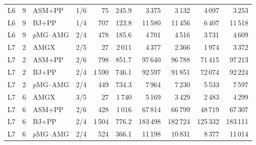 \begin{tabular}{lrlrrrrrrr}
L6 & 9 & ASM+PP & 1/6 & 75 & 245.9 & 3\,375 & 3\,132 & 4\,097 & 3\,253\\
L6 & 9 & BJ+PP & 1/4 & 707 & 123.8 & 11\,580 & 11\,456 & 6\,407 & 11\,518\\
L6 & 9 & $p$MG--AMG & 2/4 & 478 & 185.6 & 4\,701 & 4\,516 & 3\,731 & 4\,609\\
L7 & 2 & AMGX & 2/5 & 27 & 2\,011 & 4\,377 & 2\,366 & 1\,974 & 3\,372\\
L7 & 2 & ASM+PP & 2/6 & 798 & 851.7 & 97\,640 & 96\,788 & 71\,415 & 97\,213\\
L7 & 2 & BJ+PP & 2/4 & 1\,590 & 746.1 & 92\,597 & 91\,851 & 72\,074 & 92\,224\\
L7 & 2 & $p$MG--AMG & 2/4 & 449 & 734.3 & 7\,964 & 7\,230 & 5\,533 & 7\,597\\
L7 & 6 & AMGX & 3/5 & 27 & 1\,740 & 5\,169 & 3\,429 & 2\,483 & 4\,299\\
L7 & 6 & ASM+PP & 2/6 & 428 & 1\,016 & 67\,814 & 66\,799 & 48\,719 & 67\,307\\
L7 & 6 & BJ+PP & 2/4 & 1\,504 & 776.2 & 183\,498 & 182\,724 & 125\,332 & 183\,111\\
L7 & 6 & $p$MG--AMG & 2/4 & 524 & 366.1 & 11\,198 & 10\,831 & 8\,377 & 11\,014\\
\bottomrule
\end{tabular}
